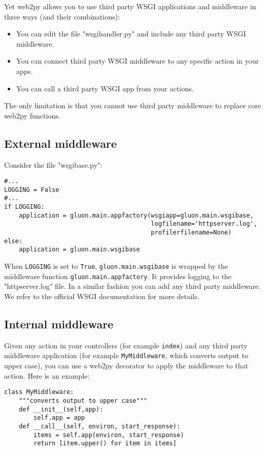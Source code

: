 \documentclass[justified,sixbynine,notoc]{tufte-book}
\def\ft{\small\tt}
\begin{document}
\begin{fullwidth}
Yet web2py allows you to use third party WSGI applications and middleware in three ways (and their combinations):
\begin{itemize}
\item You can edit the file "wsgihandler.py" and include any third party WSGI middleware.

\item You can connect third party WSGI middleware to any specific action in your apps.

\item You can call a third party WSGI app from your actions.
\end{itemize}

The only limitation is that you cannot use third party middleware to replace core web2py functions.

\goodbreak\subsection{External middleware}

Consider the file "wsgibase.py":
\begin{lstlisting}
#...
LOGGING = False
#...
if LOGGING:
    application = gluon.main.appfactory(wsgiapp=gluon.main.wsgibase,
                                        logfilename='httpserver.log',
                                        profilerfilename=None)
else:
    application = gluon.main.wsgibase
\end{lstlisting}

When {\ft LOGGING} is set to {\ft True}, {\ft gluon.main.wsgibase} is wrapped by the middleware function {\ft gluon.main.appfactory}. It provides logging to the "httpserver.log" file. In a similar fashion you can add any third party middleware. We refer to the official WSGI documentation for more details.

\goodbreak\subsection{Internal middleware}

Given any action in your controllers (for example {\ft index}) and any third party middleware application (for example {\ft MyMiddleware}, which converts output to upper case), you can use a web2py decorator to apply the middleware to that action. Here is an example:
\begin{lstlisting}
class MyMiddleware:
    """converts output to upper case"""
    def __init__(self,app):
        self.app = app
    def __call__(self, environ, start_response):
        items = self.app(environ, start_response)
        return [item.upper() for item in items]


\end{lstlisting}
\end{fullwidth}
\end{document}
